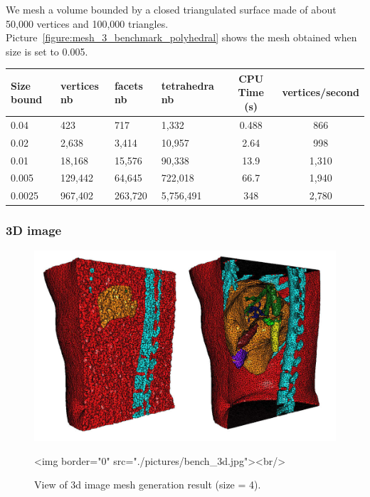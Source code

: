 We mesh a volume bounded by a closed triangulated surface made of about 50,000 vertices and 100,000 triangles.
Picture~\ref{figure:mesh_3_benchmark_polyhedral} shows the mesh obtained when
size is set to 0.005.

\begin{center}
\begin{tabular}{|l|l|l|l||c|c|}
  \hline
  Size bound & vertices nb & facets nb & tetrahedra nb & CPU Time (s) & vertices/second \\
  \hline
  0.04 & 423 & 717 & 1,332 & 0.488 & 866 \\
  0.02 & 2,638 & 3,414 & 10,957 & 2.64 & 998 \\
  0.01 & 18,168 & 15,576 & 90,338 & 13.9 & 1,310 \\
  0.005 & 129,442 & 64,645 & 722,018 & 66.7 & 1,940 \\
  0.0025 & 967,402 & 263,720 & 5,756,491 & 348 & 2,780 \\
  \hline
\end{tabular}
\end{center}

\subsubsection{3D image}

\begin{figure}[ht]
\begin{center}
 \begin{ccTexOnly}
   \includegraphics[width=14cm]{Mesh_3/pictures/bench_3d.jpg}
 \end{ccTexOnly}
 \begin{ccHtmlOnly}
   <img border="0" src="./pictures/bench_3d.jpg"><br/>
 \end{ccHtmlOnly}
 \caption{View of 3d image mesh generation result (size = 4).}
  \label{figure:mesh_3_benchmark_3d_image}
\end{center}
\end{figure}

